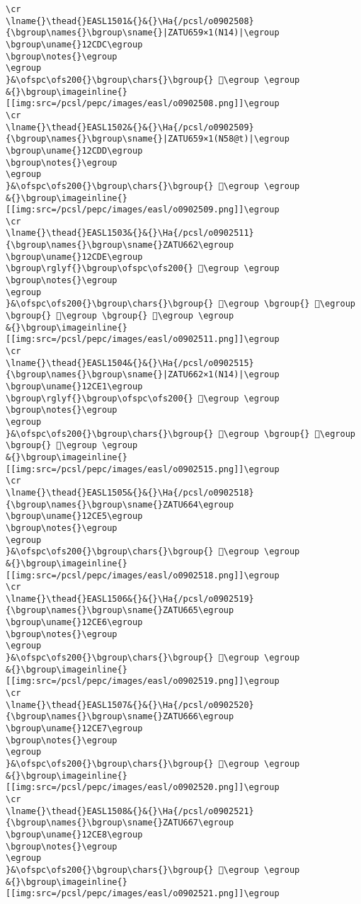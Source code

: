 \begin{verbatim}
\cr
\lname{}\thead{}EASL1501&{}&{}\Ha{/pcsl/o0902508}{\bgroup\names{}\bgroup\sname{}|ZATU659×1(N14)|\egroup
\bgroup\uname{}12CDC\egroup
\bgroup\notes{}\egroup
\egroup
}&\ofspc\ofs200{}\bgroup\chars{}\bgroup{} 𒳜\egroup \egroup
&{}\bgroup\imageinline{}[[img:src=/pcsl/pepc/images/easl/o0902508.png]]\egroup
\cr
\lname{}\thead{}EASL1502&{}&{}\Ha{/pcsl/o0902509}{\bgroup\names{}\bgroup\sname{}|ZATU659×1(N58@t)|\egroup
\bgroup\uname{}12CDD\egroup
\bgroup\notes{}\egroup
\egroup
}&\ofspc\ofs200{}\bgroup\chars{}\bgroup{} 𒳝\egroup \egroup
&{}\bgroup\imageinline{}[[img:src=/pcsl/pepc/images/easl/o0902509.png]]\egroup
\cr
\lname{}\thead{}EASL1503&{}&{}\Ha{/pcsl/o0902511}{\bgroup\names{}\bgroup\sname{}ZATU662\egroup
\bgroup\uname{}12CDE\egroup
\bgroup\rglyf{}\bgroup\ofspc\ofs200{} 𒳞\egroup \egroup
\bgroup\notes{}\egroup
\egroup
}&\ofspc\ofs200{}\bgroup\chars{}\bgroup{} 𒳤\egroup \bgroup{} 𒳠\egroup \bgroup{} 𒳞\egroup \bgroup{} 𒳢\egroup \egroup
&{}\bgroup\imageinline{}[[img:src=/pcsl/pepc/images/easl/o0902511.png]]\egroup
\cr
\lname{}\thead{}EASL1504&{}&{}\Ha{/pcsl/o0902515}{\bgroup\names{}\bgroup\sname{}|ZATU662×1(N14)|\egroup
\bgroup\uname{}12CE1\egroup
\bgroup\rglyf{}\bgroup\ofspc\ofs200{} 𒳡\egroup \egroup
\bgroup\notes{}\egroup
\egroup
}&\ofspc\ofs200{}\bgroup\chars{}\bgroup{} 𒳡\egroup \bgroup{} 𒳟\egroup \bgroup{} 𒳣\egroup \egroup
&{}\bgroup\imageinline{}[[img:src=/pcsl/pepc/images/easl/o0902515.png]]\egroup
\cr
\lname{}\thead{}EASL1505&{}&{}\Ha{/pcsl/o0902518}{\bgroup\names{}\bgroup\sname{}ZATU664\egroup
\bgroup\uname{}12CE5\egroup
\bgroup\notes{}\egroup
\egroup
}&\ofspc\ofs200{}\bgroup\chars{}\bgroup{} 𒳥\egroup \egroup
&{}\bgroup\imageinline{}[[img:src=/pcsl/pepc/images/easl/o0902518.png]]\egroup
\cr
\lname{}\thead{}EASL1506&{}&{}\Ha{/pcsl/o0902519}{\bgroup\names{}\bgroup\sname{}ZATU665\egroup
\bgroup\uname{}12CE6\egroup
\bgroup\notes{}\egroup
\egroup
}&\ofspc\ofs200{}\bgroup\chars{}\bgroup{} 𒳦\egroup \egroup
&{}\bgroup\imageinline{}[[img:src=/pcsl/pepc/images/easl/o0902519.png]]\egroup
\cr
\lname{}\thead{}EASL1507&{}&{}\Ha{/pcsl/o0902520}{\bgroup\names{}\bgroup\sname{}ZATU666\egroup
\bgroup\uname{}12CE7\egroup
\bgroup\notes{}\egroup
\egroup
}&\ofspc\ofs200{}\bgroup\chars{}\bgroup{} 𒳧\egroup \egroup
&{}\bgroup\imageinline{}[[img:src=/pcsl/pepc/images/easl/o0902520.png]]\egroup
\cr
\lname{}\thead{}EASL1508&{}&{}\Ha{/pcsl/o0902521}{\bgroup\names{}\bgroup\sname{}ZATU667\egroup
\bgroup\uname{}12CE8\egroup
\bgroup\notes{}\egroup
\egroup
}&\ofspc\ofs200{}\bgroup\chars{}\bgroup{} 𒳨\egroup \egroup
&{}\bgroup\imageinline{}[[img:src=/pcsl/pepc/images/easl/o0902521.png]]\egroup

\end{verbatim}
